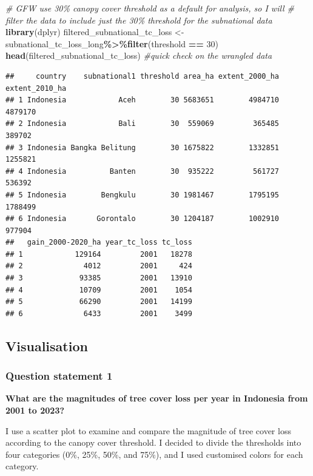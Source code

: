 \documentclass[
]{article}
\newenvironment{Shaded}{\begin{snugshade}}{\end{snugshade}}
\newcommand{\CommentTok}[1]{\textcolor[rgb]{0.56,0.35,0.01}{\textit{#1}}}
\newcommand{\DecValTok}[1]{\textcolor[rgb]{0.00,0.00,0.81}{#1}}
\newcommand{\FunctionTok}[1]{\textcolor[rgb]{0.13,0.29,0.53}{\textbf{#1}}}
\newcommand{\NormalTok}[1]{#1}
\newcommand{\OtherTok}[1]{\textcolor[rgb]{0.56,0.35,0.01}{#1}}
\newcommand{\SpecialCharTok}[1]{\textcolor[rgb]{0.81,0.36,0.00}{\textbf{#1}}}
\begin{document}
\begin{Shaded}
\begin{Highlighting}[]
\CommentTok{\# GFW use 30\% canopy cover threshold as a default for analysis, so I will}
\CommentTok{\# filter the data to include just the 30\% threshold for the subnational data}
\FunctionTok{library}\NormalTok{(dplyr)}
\NormalTok{filtered\_subnational\_tc\_loss }\OtherTok{\textless{}{-}}\NormalTok{ subnational\_tc\_loss\_long}\SpecialCharTok{\%\textgreater{}\%}\FunctionTok{filter}\NormalTok{(threshold }\SpecialCharTok{==} \DecValTok{30}\NormalTok{)}
\FunctionTok{head}\NormalTok{(filtered\_subnational\_tc\_loss) }\CommentTok{\#quick check on the wrangled data}
\end{Highlighting}
\end{Shaded}

\begin{verbatim}
##     country    subnational1 threshold area_ha extent_2000_ha extent_2010_ha
## 1 Indonesia            Aceh        30 5683651        4984710        4879170
## 2 Indonesia            Bali        30  559069         365485         389702
## 3 Indonesia Bangka Belitung        30 1675822        1332851        1255821
## 4 Indonesia          Banten        30  935222         561727         536392
## 5 Indonesia        Bengkulu        30 1981467        1795195        1788499
## 6 Indonesia       Gorontalo        30 1204187        1002910         977904
##   gain_2000-2020_ha year_tc_loss tc_loss
## 1            129164         2001   18278
## 2              4012         2001     424
## 3             93385         2001   13910
## 4             10709         2001    1054
## 5             66290         2001   14199
## 6              6433         2001    3499
\end{verbatim}

\subsection{Visualisation}\label{visualisation}

\subsubsection{Question statement 1}\label{question-statement-1}

\textbf{What are the magnitudes of tree cover loss per year in Indonesia
from 2001 to 2023?}

I use a scatter plot to examine and compare the magnitude of tree cover
loss according to the canopy cover threshold. I decided to divide the
thresholds into four categories (0\%, 25\%, 50\%, and 75\%), and I used
customised colors for each category.
\end{document}
